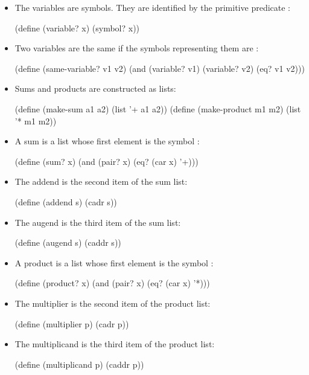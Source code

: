 \begin{itemize}

	\item
		The variables are symbols.
		They are identified by the primitive predicate :
		\begin{scheme}
		  (define (variable? x) (symbol? x))
		\end{scheme}

	\item
		Two variables are the same if the symbols representing them are :
		\begin{scheme}
		  (define (same-variable? v1 v2)
		    (and (variable? v1) (variable? v2) (eq? v1 v2)))
		\end{scheme}

	\item
		Sums and products are constructed as lists:
		\begin{scheme}
		  (define (make-sum a1 a2) (list '+ a1 a2))
		  (define (make-product m1 m2) (list '* m1 m2))
		\end{scheme}

	\item
		A sum is a list whose first element is the symbol \code{+}:
		\begin{scheme}
		  (define (sum? x) (and (pair? x) (eq? (car x) '+)))
		\end{scheme}

	\item
		The addend is the second item of the sum list:
		\begin{scheme}
		  (define (addend s) (cadr s))
		\end{scheme}

	\item
		The augend is the third item of the sum list:
		\begin{scheme}
		  (define (augend s) (caddr s))
		\end{scheme}

	\item
		A product is a list whose first element is the symbol \code{*}:
		\begin{scheme}
		  (define (product? x) (and (pair? x) (eq? (car x) '*)))
		\end{scheme}

	\item
		The multiplier is the second item of the product list:
		\begin{scheme}
		  (define (multiplier p) (cadr p))
		\end{scheme}

	\item
		The multiplicand is the third item of the product list:
		\begin{scheme}
		  (define (multiplicand p) (caddr p))
		\end{scheme}

\end{itemize}
